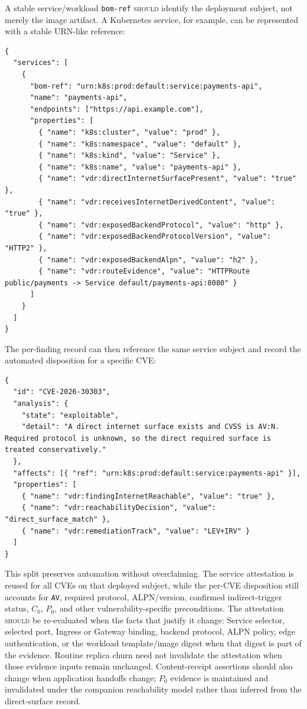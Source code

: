 \documentclass[11pt]{article}
\newcommand{\code}[1]{\texttt{#1}}
\newcommand{\rfckw}[1]{\textsc{#1}}
\begin{document}
A stable service/workload \code{bom-ref} \rfckw{should} identify the deployment subject,
not merely the image artifact. A Kubernetes service, for example, can be represented with
a stable URN-like reference:
\begin{lstlisting}[style=json]
{
  "services": [
    {
      "bom-ref": "urn:k8s:prod:default:service:payments-api",
      "name": "payments-api",
      "endpoints": ["https://api.example.com"],
      "properties": [
        { "name": "k8s:cluster", "value": "prod" },
        { "name": "k8s:namespace", "value": "default" },
        { "name": "k8s:kind", "value": "Service" },
        { "name": "k8s:name", "value": "payments-api" },
        { "name": "vdr:directInternetSurfacePresent", "value": "true" },
        { "name": "vdr:receivesInternetDerivedContent", "value": "true" },
        { "name": "vdr:exposedBackendProtocol", "value": "http" },
        { "name": "vdr:exposedBackendProtocolVersion", "value": "HTTP2" },
        { "name": "vdr:exposedBackendAlpn", "value": "h2" },
        { "name": "vdr:routeEvidence", "value": "HTTPRoute public/payments -> Service default/payments-api:8080" }
      ]
    }
  ]
}
\end{lstlisting}

The per-finding record can then reference the same service subject and record the
automated disposition for a specific CVE:
\begin{lstlisting}[style=json]
{
  "id": "CVE-2026-30303",
  "analysis": {
    "state": "exploitable",
    "detail": "A direct internet surface exists and CVSS is AV:N. Required protocol is unknown, so the direct required surface is treated conservatively."
  },
  "affects": [{ "ref": "urn:k8s:prod:default:service:payments-api" }],
  "properties": [
    { "name": "vdr:findingInternetReachable", "value": "true" },
    { "name": "vdr:reachabilityDecision", "value": "direct_surface_match" },
    { "name": "vdr:remediationTrack", "value": "LEV+IRV" }
  ]
}
\end{lstlisting}

This split preserves automation without overclaiming. The service attestation is reused
for all CVEs on that deployed subject, while the per-CVE disposition still accounts for
\code{AV}, required protocol, ALPN/version, confirmed indirect-trigger status, $C_0$,
$P_0$, and other vulnerability-specific preconditions.
The attestation \rfckw{should} be re-evaluated when the facts that justify it
change: Service selector, selected port, Ingress or Gateway binding, backend protocol,
ALPN policy, edge authentication, or the workload template/image digest when that digest
is part of the evidence. Routine replica churn need not invalidate the attestation when
those evidence inputs remain unchanged. Content-receipt assertions should also
change when application handoffs change; $P_0$ evidence is maintained and
invalidated under the companion reachability model rather than inferred from the
direct-surface record.
\end{document}
